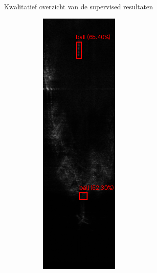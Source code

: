 \documentclass[aspectratio=169]{beamer}
\begin{document}
    \begin{frame}{Kwalitatief overzicht van de supervised resultaten}
        \begin{figure}
            \centering
            \begin{subfigure}{.15\textwidth}
                \centering
                \captionsetup{justification=centering}
                \includegraphics[width=0.9\linewidth]{251_faster_rcnn_1pct.png}

\end{subfigure}
\end{figure}
\end{frame}
\end{document}
